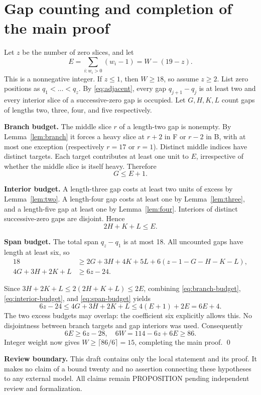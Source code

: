 \documentclass{article}
\begin{document}
\section{Gap counting and completion of the main proof}\label{sec:counting}

Let \(z\) be the number of zero slices, and let
\begin{equation}
  E = \sum_{i : w_i > 0} (w_i - 1) = W - (19 - z).
\end{equation}
This is a nonnegative integer. If \(z \le 1\), then \(W \ge 18\), so assume \(z \ge 2\). List
zero positions as \(q_1 < \ldots < q_z\). By \eqref{eq:adjacent}, every gap \(q_{j+1} - q_j\) is
at least two and every interior slice of a successive-zero gap is occupied. Let \(G, H, K, L\)
count gaps of lengths two, three, four, and five respectively.

\textbf{Branch budget.} The middle slice \(r\) of a length-two gap is nonempty. By
Lemma~\ref{lem:branch} it forces a heavy slice at \(r + 2\) in F or \(r - 2\) in B, with at most
one exception (respectively \(r = 17\) or \(r = 1\)). Distinct middle indices have distinct
targets. Each target contributes at least one unit to \(E\), irrespective of whether the middle
slice is itself heavy. Therefore
\begin{equation}\label{eq:branch-budget}
  G \le E + 1.
\end{equation}

\textbf{Interior budget.} A length-three gap costs at least two units of excess by
Lemma~\ref{lem:two}. A length-four gap costs at least one by Lemma~\ref{lem:three}, and a
length-five gap at least one by Lemma~\ref{lem:four}. Interiors of distinct successive-zero gaps
are disjoint. Hence
\begin{equation}\label{eq:interior-budget}
  2H + K + L \le E.
\end{equation}

\textbf{Span budget.} The total span \(q_z - q_1\) is at most 18. All uncounted gaps have length
at least six, so
\begin{equation}\label{eq:span-budget}
  \begin{aligned}
    18 &\ge 2G + 3H + 4K + 5L + 6(z - 1 - G - H - K - L), \\
    4G + 3H + 2K + L &\ge 6z - 24.
  \end{aligned}
\end{equation}

Since \(3H + 2K + L \le 2(2H + K + L) \le 2E\), combining \eqref{eq:branch-budget},
\eqref{eq:interior-budget}, and \eqref{eq:span-budget} yields
\begin{equation}
  6z - 24 \le 4G + 3H + 2K + L \le 4(E + 1) + 2E = 6E + 4.
\end{equation}
The two excess budgets may overlap: the coefficient six explicitly allows this. No disjointness
between branch targets and gap interiors was used. Consequently
\begin{equation}
  6E \ge 6z - 28, \quad 6W = 114 - 6z + 6E \ge 86.
\end{equation}
Integer weight now gives \(W \ge \lceil 86/6 \rceil = 15\), completing the main proof. \qed

\textbf{Review boundary.} This draft contains only the local statement and its proof. It makes no
claim of a bound twenty and no assertion connecting these hypotheses to any external model. All
claims remain PROPOSITION pending independent review and formalization.
\end{document}
